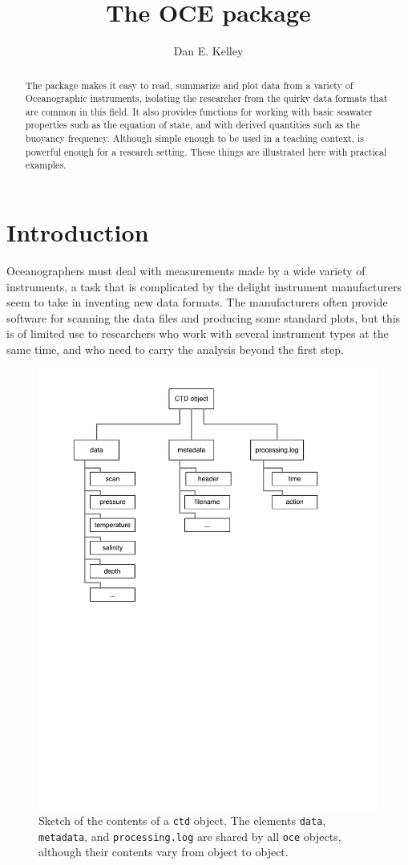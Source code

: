 \documentclass{article}
\begin{document}
\title{The OCE package}
\author{Dan E. Kelley}
\maketitle


\begin{abstract}

The \verb@oce@ package makes it easy to read, summarize and plot data from a
variety of Oceanographic instruments, isolating the researcher from the quirky
data formats that are common in this field. It also provides functions for
working with basic seawater properties such as the equation of state, and with
derived quantities such as the buoyancy frequency.  Although simple enough to be
used in a teaching context, \verb@oce@ is powerful enough for a research
setting.  These things are illustrated here with practical examples.

\end{abstract}

\section{Introduction}

Oceanographers must deal with measurements made by a wide variety of
instruments, a task that is complicated by the delight instrument manufacturers
seem to take in inventing new data formats. The manufacturers often provide
software for scanning the data files and producing some standard plots, but this
is of limited use to researchers who work with several instrument types at the
same time, and who need to carry the analysis beyond the first step.

\begin{figure}
  \begin{center}
    \includegraphics[width=0.6\hsize]{ctd-object}
  \end{center}
  \caption{\label{f:ctdobject}Sketch of the contents of a \texttt{ctd}
    object. The elements \texttt{data}, \texttt{metadata}, and
    \texttt{processing.log} are shared by all \texttt{oce} objects, although
    their contents vary from object to object.}
\end{figure}
\end{document}
